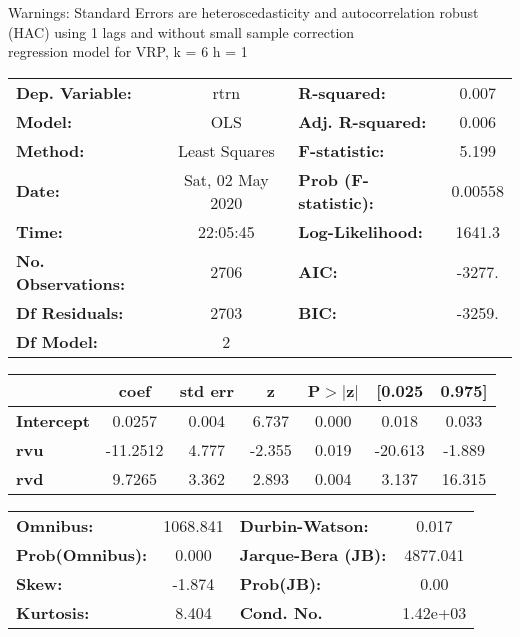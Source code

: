 Warnings: \newline
 [1] Standard Errors are heteroscedasticity and autocorrelation robust (HAC) using 1 lags and without small sample correction\\ 

regression model for VRP, k = 6 h = 1\begin{center}
\begin{tabular}{lclc}
\toprule
\textbf{Dep. Variable:}    &       rtrn       & \textbf{  R-squared:         } &     0.007   \\
\textbf{Model:}            &       OLS        & \textbf{  Adj. R-squared:    } &     0.006   \\
\textbf{Method:}           &  Least Squares   & \textbf{  F-statistic:       } &     5.199   \\
\textbf{Date:}             & Sat, 02 May 2020 & \textbf{  Prob (F-statistic):} &  0.00558    \\
\textbf{Time:}             &     22:05:45     & \textbf{  Log-Likelihood:    } &    1641.3   \\
\textbf{No. Observations:} &        2706      & \textbf{  AIC:               } &    -3277.   \\
\textbf{Df Residuals:}     &        2703      & \textbf{  BIC:               } &    -3259.   \\
\textbf{Df Model:}         &           2      & \textbf{                     } &             \\
\bottomrule
\end{tabular}
\begin{tabular}{lcccccc}
                   & \textbf{coef} & \textbf{std err} & \textbf{z} & \textbf{P$> |$z$|$} & \textbf{[0.025} & \textbf{0.975]}  \\
\midrule
\textbf{Intercept} &       0.0257  &        0.004     &     6.737  &         0.000        &        0.018    &        0.033     \\
\textbf{rvu}       &     -11.2512  &        4.777     &    -2.355  &         0.019        &      -20.613    &       -1.889     \\
\textbf{rvd}       &       9.7265  &        3.362     &     2.893  &         0.004        &        3.137    &       16.315     \\
\bottomrule
\end{tabular}
\begin{tabular}{lclc}
\textbf{Omnibus:}       & 1068.841 & \textbf{  Durbin-Watson:     } &    0.017  \\
\textbf{Prob(Omnibus):} &   0.000  & \textbf{  Jarque-Bera (JB):  } & 4877.041  \\
\textbf{Skew:}          &  -1.874  & \textbf{  Prob(JB):          } &     0.00  \\
\textbf{Kurtosis:}      &   8.404  & \textbf{  Cond. No.          } & 1.42e+03  \\
\bottomrule
\end{tabular}
\end{center}

